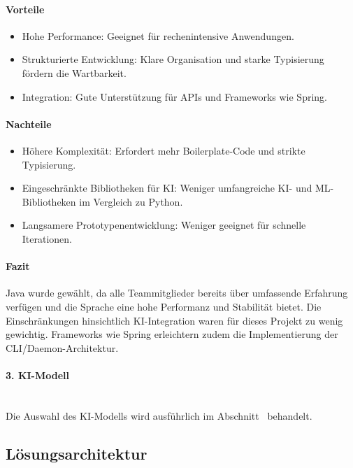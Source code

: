 \documentclass[a4paper,12pt]{report}
\begin{document}
    \paragraph*{Vorteile}
    \begin{itemize}
        \item Hohe Performance: Geeignet für rechenintensive Anwendungen.
        \item Strukturierte Entwicklung: Klare Organisation und starke Typisierung fördern die Wartbarkeit.
        \item Integration: Gute Unterstützung für APIs und Frameworks wie Spring.
    \end{itemize}

    \paragraph*{Nachteile}
    \begin{itemize}
        \item Höhere Komplexität: Erfordert mehr Boilerplate-Code und strikte Typisierung.
        \item Eingeschränkte Bibliotheken für KI: Weniger umfangreiche KI- und ML-Bibliotheken im Vergleich zu Python.
        \item Langsamere Prototypenentwicklung: Weniger geeignet für schnelle Iterationen.
    \end{itemize}

    \paragraph*{Fazit}
    Java wurde gewählt, da alle Teammitglieder bereits über umfassende Erfahrung verfügen und die Sprache eine hohe Performanz und Stabilität bietet.
    Die Einschränkungen hinsichtlich KI-Integration waren für dieses Projekt zu wenig gewichtig.
    Frameworks wie Spring erleichtern zudem die Implementierung der CLI/Daemon-Architektur.


    \paragraph*{3. KI-Modell}\mbox{}\\
    Die Auswahl des KI-Modells wird ausführlich im Abschnitt~ behandelt.
    \clearpage

    \subsection{Lösungsarchitektur}\label{subsec:loesungsarchitektur}
\end{document}
